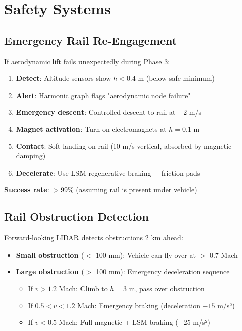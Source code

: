 \documentclass[12pt,a4paper]{article}
\begin{document}
\section{Safety Systems}

\subsection{Emergency Rail Re-Engagement}

If aerodynamic lift fails unexpectedly during Phase 3:

\begin{enumerate}
\item \textbf{Detect}: Altitude sensors show $h < 0.4$ m (below safe minimum)
\item \textbf{Alert}: Harmonic graph flags "aerodynamic node failure"
\item \textbf{Emergency descent}: Controlled descent to rail at $-2$ m/s
\item \textbf{Magnet activation}: Turn on electromagnets at $h = 0.1$ m
\item \textbf{Contact}: Soft landing on rail (10 m/s vertical, absorbed by magnetic damping)
\item \textbf{Decelerate}: Use LSM regenerative braking + friction pads
\end{enumerate}

\textbf{Success rate}: $>$99\% (assuming rail is present under vehicle)

\subsection{Rail Obstruction Detection}

Forward-looking LIDAR detects obstructions 2 km ahead:

\begin{itemize}
\item \textbf{Small obstruction} ($<$ 100 mm): Vehicle can fly over at $>$ 0.7 Mach
\item \textbf{Large obstruction} ($>$ 100 mm): Emergency deceleration sequence
  \begin{itemize}
  \item If $v > 1.2$ Mach: Climb to $h = 3$ m, pass over obstruction
  \item If $0.5 < v < 1.2$ Mach: Emergency braking (deceleration $-15$ m/s²)
  \item If $v < 0.5$ Mach: Full magnetic + LSM braking ($-25$ m/s²)
  \end{itemize}
\end{itemize}
\end{document}

